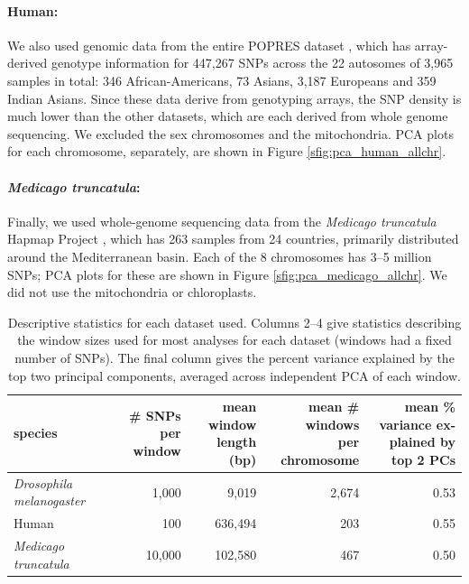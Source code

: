 \documentclass[11pt, oneside]{article}   	%
\begin{document}
\paragraph{Human:}
We also used genomic data from the entire POPRES dataset \citep{nelson2008population},
which has array-derived genotype information for 447,267 SNPs across the 22 autosomes
of 3,965 samples in total: 346 African-Americans, 73 Asians, 3,187 Europeans and 359 Indian Asians.
Since these data derive from genotyping arrays, the SNP density is much lower than the other datasets,
which are each derived from whole genome sequencing.
We excluded the sex chromosomes and the mitochondria.
PCA plots for each chromosome, separately, are shown in Figure \ref{sfig:pca_human_allchr}.


\paragraph{\textit{Medicago truncatula}:}
Finally, we used whole-genome sequencing data from the \textit{Medicago truncatula} Hapmap Project \citep{tang2014improved},
which has 263 samples from 24 countries,
primarily distributed around the Mediterranean basin.
Each of the 8 chromosomes has 3--5 million SNPs;
PCA plots for these are shown in Figure \ref{sfig:pca_medicago_allchr}.
We did not use the mitochondria or chloroplasts.

\begin{table}[ht]
\centering
    \begin{tabular}{p{0.8in}rrrr}
  \hline
    species 
    & \parbox[t]{.8in}{\# SNPs per \\ window} 
    & \parbox[t]{1in}{mean window\\ length (bp)}
    & \parbox[t]{1.2in}{mean \# windows \\ per chromosome} 
    & \parbox[t]{1.4in}{mean \% variance ex-\\plained by top 2 PCs} \\ 
  \hline
  \textit{Drosophila melanogaster} & 1,000 & 9,019 & 2,674 & 0.53 \\ 
  Human & 100 & 636,494 & 203 & 0.55 \\ 
  \textit{Medicago truncatula} & 10,000 & 102,580 & 467 & 0.50 \\ 
   \hline
\end{tabular}
\caption{
    Descriptive statistics for each dataset used.
    Columns 2--4 give statistics describing the window sizes used for most analyses for each dataset
    (windows had a fixed number of SNPs).
    The final column gives the percent variance explained by the top two principal components,
    averaged across independent PCA of each window.
    \label{tab:data_stats}
}
\end{table}
\end{document}
